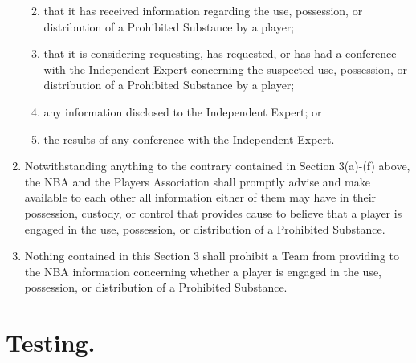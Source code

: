 \documentclass[
]{book}
\providecommand{\tightlist}{%
  \setlength{\itemsep}{0pt}\setlength{\parskip}{0pt}}
\begin{document}
\begin{enumerate}
  \begin{enumerate}
  \def\labelenumii{(\roman{enumii})}
  \tightlist
  \item
    that it has received information regarding the use, possession, or distribution of a Prohibited Substance by a player;
  \item
    that it is considering requesting, has requested, or has had a conference with the Independent Expert concerning the suspected use, possession, or distribution of a Prohibited Substance by a player;
  \item
    any information disclosed to the Independent Expert; or
  \item
    the results of any conference with the Independent Expert.
  \end{enumerate}
\item
  Notwithstanding anything to the contrary contained in Section 3(a)-(f) above, the NBA and the Players Association shall promptly advise and make available to each other all information either of them may have in their possession, custody, or control that provides cause to believe that a player is engaged in the use, possession, or distribution of a Prohibited Substance.
\item
  Nothing contained in this Section 3 shall prohibit a Team from providing to the NBA information concerning whether a player is engaged in the use, possession, or distribution of a Prohibited Substance.
\end{enumerate}

\hypertarget{testing.}{%
\section{Testing.}\label{testing.}}
\end{document}
